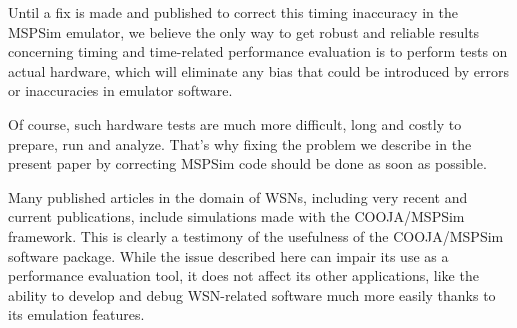 \documentclass[a4paper,10pt]{article}
\begin{document}
\medskip

Until a fix is made and published to correct this timing inaccuracy
in the MSPSim emulator, we believe the only way to get robust and reliable
results concerning timing and time-related performance evaluation is
to perform tests on actual hardware, which will eliminate any bias
that could be introduced by errors or inaccuracies in emulator software.

Of course, such hardware tests are much more difficult, long and
costly to prepare, run and analyze. That's why fixing the problem
we describe in the present paper by correcting MSPSim code should
be done as soon as possible.

Many published articles in the domain of WSNs, including very recent
and current publications, include simulations made with the COOJA/MSPSim
framework. This is clearly a testimony of the usefulness of the COOJA/MSPSim
software package. While the issue described here can impair its use as
a performance evaluation tool, it does not affect its other applications,
like the ability to develop and debug WSN-related software much more easily
thanks to its emulation features.



\vfill

{\small
}
\end{document}
